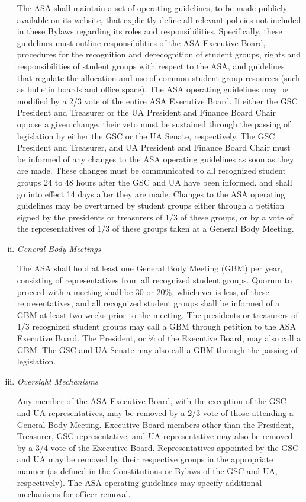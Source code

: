 \documentclass[12pt]{constitution}
\begin{document}
\begin{enumerate}[i.]
The ASA shall maintain a set of operating guidelines, to be made publicly available on its website, that
    explicitly define all relevant policies not included in these Bylaws regarding its roles and responsibilities.
Specifically, these guidelines must outline responsibilities of the ASA Executive Board, procedures for the
    recognition and derecognition of student groups, rights and responsibilities of student groups with respect to
    the ASA, and guidelines that regulate the allocation and use of common student group resources
    (such as bulletin boards and office space).
The ASA operating guidelines may be modified by a 2/3 vote of the entire ASA Executive Board.
If either the GSC President and Treasurer or the UA President and Finance Board Chair oppose a given change, their
    veto must be sustained through the passing of legislation by either the GSC or the UA Senate, respectively.
The GSC President and Treasurer, and UA President and Finance Board Chair must be informed of any changes to the
    ASA operating guidelines as soon as they are made.
These changes must be communicated to all recognized student groups 24 to 48 hours after the GSC and UA have been
    informed, and shall go into effect 14 days after they are made.
Changes to the ASA operating guidelines may be overturned by student groups either through a petition signed by
    the presidents or treasurers of 1/3 of these groups, or by a vote of the representatives of 1/3 of these
    groups taken at a General Body Meeting.

\item \textit{General Body Meetings} \label{gbms}

The ASA shall hold at least one General Body Meeting (GBM) per year, consisting of representatives from all
    recognized student groups.
Quorum to proceed with a meeting shall be 30 or 20\%, whichever is less, of these representatives, and all
    recognized student groups shall be informed of a GBM at least two weeks prior to the meeting.
The presidents or treasurers of 1/3 recognized student groups may call a GBM through petition to the
    ASA Executive Board. The President, or ½ of the Executive Board, may also call a GBM.
The GSC and UA Senate may also call a GBM through the passing of legislation.

\item \textit{Oversight Mechanisms}

Any member of the ASA Executive Board, with the exception of the GSC and UA representatives, may be removed by
    a 2/3 vote of those attending a General Body Meeting.
Executive Board members other than the President, Treasurer, GSC representative, and UA representative may
    also be removed by a 3/4 vote of the Executive Board.
Representatives appointed by the GSC and UA may be removed by their respective groups in the appropriate manner
    (as defined in the Constitutions or Bylaws of the GSC and UA, respectively).
The ASA operating guidelines may specify additional mechanisms for officer removal.


\end{enumerate}
\end{document}
